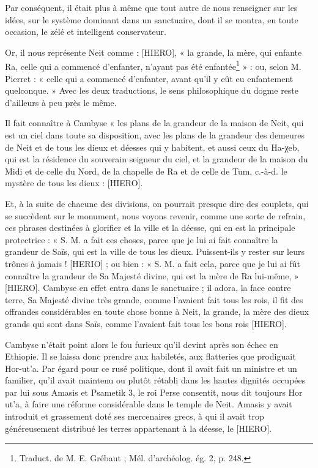 \documentclass[a4paper, 11pt, oneside]{article}
\begin{document}
Par conséquent, il était plus à même que tout autre de nous renseigner sur les idées, sur le système dominant dans un sanctuaire, dont il se montra, en toute occasion, le zélé et intelligent conservateur.

Or, il nous représente Neit comme : [HIERO], « la grande, la mère, qui enfante Ra, celle qui a commencé d'enfanter, n'ayant pas été enfantée\footnote{Traduct. de M. E. Grébaut ; Mél. d'archéolog. ég. 2, p. 248.} » : ou, selon M. Pierret : « celle qui a commencé d'enfanter, avant qu'il y eût eu enfantement quelconque. » Avec les deux traductions, le sens philosophique du dogme reste d'ailleurs à peu près le même.

Il fait connaître à Cambyse « les plans de la grandeur de la maison de Neit, qui est un ciel dans toute sa disposition, avec les plans de la grandeur des demeures de Neit et de tous les dieux et déesses qui y habitent, et aussi ceux du Ha-χeb, qui est la résidence du souverain seigneur du ciel, et la grandeur de la maison du Midi et de celle du Nord, de la chapelle de Ra et de celle de Tum, c.-à-d. le mystère de tous les dieux : [HIERO].

Et, à la suite de chacune des divisions, on pourrait presque dire des couplets, qui se succèdent sur le monument, nous voyons revenir, comme une sorte de refrain, ces phrases destinées à glorifier et la ville et la déesse, qui en est la principale protectrice : « S. M. a fait ces choses, parce que je lui ai fait connaître la grandeur de Saïs, qui est la ville de tous les dieux. Puissent-ils y rester sur leurs trônes à jamais ! [HERIO] ; ou bien : « S. M. a fait cela, parce que je lui ai fût connaître la grandeur de Sa Majesté divine, qui est la mère de Ra lui-même, » [HIERO]. Cambyse en effet entra dans le sanctuaire ; il adora, la face contre terre, Sa Majesté divine très grande, comme l'avaient fait tous les rois, il fit des offrandes considérables en toute chose bonne à Neit, la grande, la mère des dieux grands qui sont dans Saïs, comme l'avaient fait tous les bons rois [HIERO].

Cambyse n'était point alors le fou furieux qu'il devint après son échec en Ethiopie. Il se laissa donc prendre aux habiletés, aux flatteries que prodiguait Hor-ut'a. Par égard pour ce rusé politique, dont il avait fait un ministre et un familier, qu'il avait maintenu ou plutôt rétabli dans les hautes dignités occupées par lui sous Amasis et Psametik 3, le roi Perse consentit, nous dit toujours Hor ut'a, à faire une réforme considérable dans le temple de Neit. Amasis y avait introduit et grassement doté ses mercenaires grecs, à qui il avait trop généreusement distribué les terres appartenant à la déesse, le [HIERO].
\end{document}
